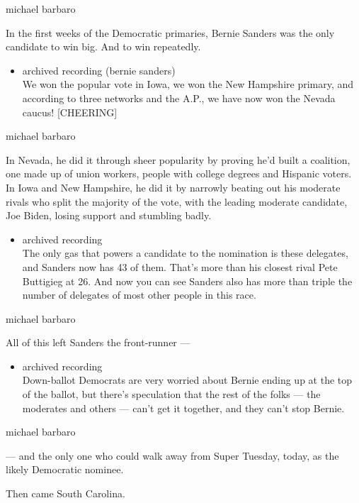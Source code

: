 michael barbaro

In the first weeks of the Democratic primaries, Bernie Sanders was the
only candidate to win big. And to win repeatedly.

\begin{itemize}
\tightlist
\item
  archived recording (bernie sanders)\\
  We won the popular vote in Iowa, we won the New Hampshire primary, and
  according to three networks and the A.P., we have now won the Nevada
  caucus! {[}CHEERING{]}
\end{itemize}

michael barbaro

In Nevada, he did it through sheer popularity by proving he'd built a
coalition, one made up of union workers, people with college degrees and
Hispanic voters. In Iowa and New Hampshire, he did it by narrowly
beating out his moderate rivals who split the majority of the vote, with
the leading moderate candidate, Joe Biden, losing support and stumbling
badly.

\begin{itemize}
\tightlist
\item
  archived recording\\
  The only gas that powers a candidate to the nomination is these
  delegates, and Sanders now has 43 of them. That's more than his
  closest rival Pete Buttigieg at 26. And now you can see Sanders also
  has more than triple the number of delegates of most other people in
  this race.
\end{itemize}

michael barbaro

All of this left Sanders the front-runner ---

\begin{itemize}
\tightlist
\item
  archived recording\\
  Down-ballot Democrats are very worried about Bernie ending up at the
  top of the ballot, but there's speculation that the rest of the folks
  --- the moderates and others --- can't get it together, and they can't
  stop Bernie.
\end{itemize}

michael barbaro

--- and the only one who could walk away from Super Tuesday, today, as
the likely Democratic nominee.

Then came South Carolina.

